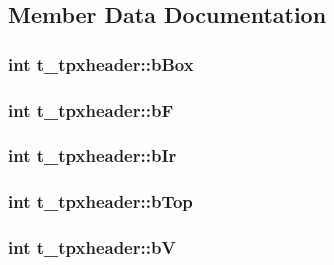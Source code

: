 \subsection{\-Member \-Data \-Documentation}
\hypertarget{structt__tpxheader_aaa3c5d59fb5f7fcf10c2ddb73e60d3e8}{
\subsubsection[{b\-Box}]{\setlength{\rightskip}{0pt plus 5cm}int {\bf t\-\_\-tpxheader\-::b\-Box}}}\label{structt__tpxheader_aaa3c5d59fb5f7fcf10c2ddb73e60d3e8}
\hypertarget{structt__tpxheader_a4a98dcdc61c2f565d039322a1ad54b01}{
\subsubsection[{b\-F}]{\setlength{\rightskip}{0pt plus 5cm}int {\bf t\-\_\-tpxheader\-::b\-F}}}\label{structt__tpxheader_a4a98dcdc61c2f565d039322a1ad54b01}
\hypertarget{structt__tpxheader_a527d46b829c8ee26fc876a5f547bddfb}{
\subsubsection[{b\-Ir}]{\setlength{\rightskip}{0pt plus 5cm}int {\bf t\-\_\-tpxheader\-::b\-Ir}}}\label{structt__tpxheader_a527d46b829c8ee26fc876a5f547bddfb}
\hypertarget{structt__tpxheader_a6e1b1dff6090e7473152d90acb23eb34}{
\subsubsection[{b\-Top}]{\setlength{\rightskip}{0pt plus 5cm}int {\bf t\-\_\-tpxheader\-::b\-Top}}}\label{structt__tpxheader_a6e1b1dff6090e7473152d90acb23eb34}
\hypertarget{structt__tpxheader_a44927f6e2a578ed397be9672fd33d3c0}{
\subsubsection[{b\-V}]{\setlength{\rightskip}{0pt plus 5cm}int {\bf t\-\_\-tpxheader\-::b\-V}}}\label{structt__tpxheader_a44927f6e2a578ed397be9672fd33d3c0}
